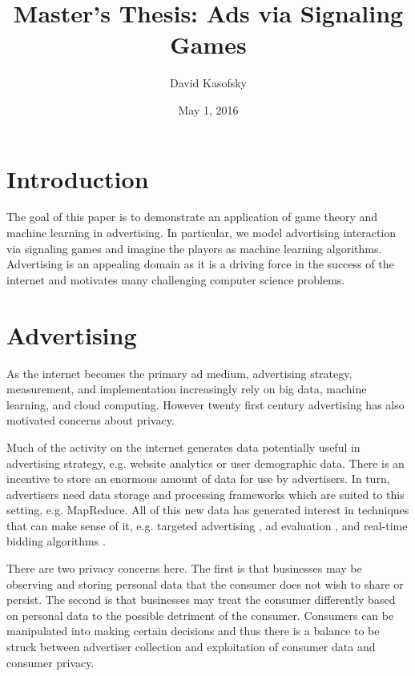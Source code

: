 \documentclass{article}
\title{Master's Thesis: Ads via Signaling Games}
\author{David Kasofsky}
\date{May 1, 2016}
\begin{document}
\maketitle

\newpage

\tableofcontents

\newpage

\section{Introduction}

The goal of this paper is to demonstrate an application of game theory and machine learning in advertising. In particular, we model advertising interaction via signaling games and imagine the players as machine learning algorithms. Advertising is an appealing domain as it is a driving force in the success of the internet and motivates many challenging computer science problems.

\section{Advertising}
As the internet becomes the primary ad medium\cite{iab1}, advertising strategy, measurement, and implementation increasingly rely on big data, machine learning, and cloud computing. However twenty first century advertising has also motivated concerns about privacy.

Much of the activity on the internet generates data potentially useful in advertising strategy, e.g. website analytics or user demographic data. There is an incentive to store an enormous amount of data for use by advertisers. In turn, advertisers need data storage and processing frameworks which are suited to this setting, e.g. MapReduce\cite{mapreduce1}. All of this new data has generated interest in techniques that can make sense of it, e.g. targeted advertising \cite{displayadsml1}, ad evaluation \cite{abhishek2012media}, and real-time bidding algorithms \cite{yuan2014survey}.

There are two privacy concerns here. The first is that businesses may be observing and storing personal data that the consumer does not wish to share or persist. The second is that businesses may treat the consumer differently based on personal data to the possible detriment of the consumer. Consumers can be manipulated into making certain decisions \cite{akerlof2015phishing} and thus there is a balance to be struck between advertiser collection and exploitation of consumer data and consumer privacy.
\end{document}
